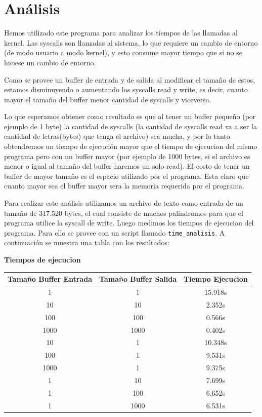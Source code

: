 \documentclass[11pt,a4paper]{article}
\begin{document}
\section{Análisis}
Hemos utilizado este programa para analizar los tiempos de las llamadas al kernel. Las syscalls son llamadas al sistema, lo que requiere un cambio de entorno (de modo usuario a modo kernel), y esto consume mayor tiempo que si no se hiciese un cambio de entorno.

Como se provee un buffer de entrada y de salida al modificar el tamaño de estos, estamos disminuyendo o aumentando los syscalls read y write, es decir, cuanto mayor el tamaño del buffer menor cantidad de syscalls y viceversa.

Lo que esperamos obtener como resultado es que al tener un buffer pequeño (por ejemplo de 1 byte) la cantidad de syscalls (la cantidad de syscalls read va a ser la cantidad de letras(bytes) que tenga el archivo) sea mucha, y por lo tanto obtendremos un tiempo de ejecución mayor que el tiempo de ejecucion del mismo programa pero con un buffer mayor (por ejemplo de 1000 bytes, si el archivo es menor o igual al tamaño del buffer haremos un solo read).
El costo de tener un buffer de mayor tamaño es el espacio utilizado por el programa. Esta claro que cuanto mayor sea el buffer mayor sera la memoria requerida por el programa.

Para realizar este análisis utilizamos un archivo de texto como entrada de un tamaño de 317.520 bytes, el cual consiste de muchos palindromos para que el programa utilice la syscall de write. Luego medimos los tiempos de ejecucion del programa. Para ello se provee con un script llamado \texttt{time\_analisis}.
A continuación se muestra una tabla con los resultados:

\begin{table}[h]
	\centering
	\textbf{Tiempos de ejecucion}\\
	\begin{tabular}{|c|c|c|}
		\hline
		Tamaño Buffer Entrada & Tamaño Buffer Salida & Tiempo Ejecucion \\
		\hline
		1 & 1 & 15.918s\\
		\hline
		10 & 10 & 2.352s\\
		\hline
		100 & 100 & 0.566s\\
		\hline
		1000 & 1000 & 0.402s\\
		\hline
		10 & 1 & 10.348s\\
		\hline
		100 & 1 & 9.531s\\
		\hline
		1000 & 1 & 9.375s\\
		\hline
		1 & 10 & 7.699s\\
		\hline
		1 & 100 & 6.652s\\
		\hline
		1 & 1000 & 6.531s\\
		\hline
	\end{tabular}
\end{table}
\end{document}
